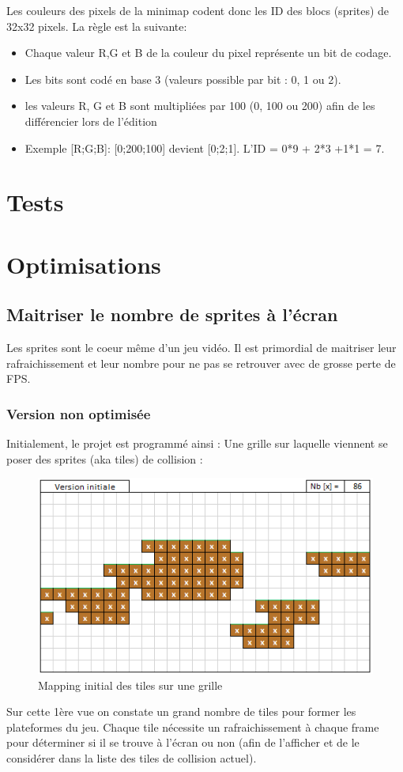 \documentclass{report}
\begin{document}
Les couleurs des pixels de la minimap codent donc les ID des blocs (sprites) de 32x32 pixels. La règle est la suivante:
\begin{itemize}
\item Chaque valeur R,G et B de la couleur du pixel repr\'{e}sente un bit de codage.
\item Les bits sont cod\'{e} en base 3 (valeurs possible par bit : 0, 1 ou 2).
\item les valeurs R, G et B sont multipli\'{e}es par 100 (0, 100 ou 200) afin de les diff\'{e}rencier lors de l'\'{e}dition
\item Exemple [R;G;B]: [0;200;100] devient [0;2;1]. L'ID = 0*9 + 2*3 +1*1 = 7.
\end{itemize}

		\chapter{Tests}
		\chapter{Optimisations}
			\section{Maitriser le nombre de sprites à l'\'{e}cran}
			
Les sprites sont le coeur même d'un jeu vid\'{e}o. Il est primordial de maitriser leur rafraichissement et leur nombre pour ne pas se retrouver avec de grosse perte
de FPS.

				\subsection{Version non optimis\'{e}e}
Initialement, le projet est programm\'{e} ainsi : Une grille sur laquelle viennent se poser des sprites (aka tiles) de collision :

\begin{figure}[h!]
	\caption{\label{Mapping initial des tiles} Mapping initial des tiles sur une grille}
	\includegraphics[scale=1]{Opti_tiles_001.png}
	\centering
\end{figure}
Sur cette 1\`{e}re vue on constate un grand nombre de tiles pour former les plateformes du jeu. Chaque tile n\'{e}cessite un rafraichissement à chaque frame pour
d\'{e}terminer si il se trouve à l'\'{e}cran ou non (afin de l'afficher et de le consid\'{e}rer dans la liste des tiles de collision actuel).
\end{document}
